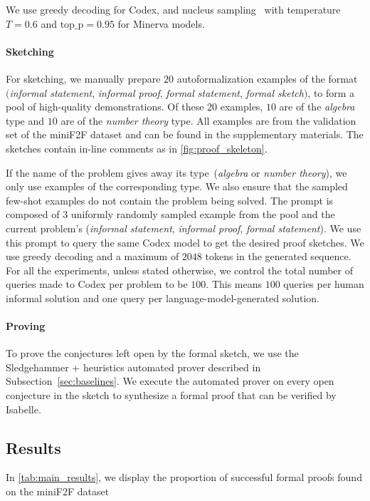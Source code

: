 We use greedy decoding for Codex, and nucleus sampling~\citep{holtzman2019curious} with temperature $T=0.6$ and $\textrm{top}\_\textrm{p}=0.95$ for Minerva models.

\paragraph{Sketching}
For sketching, we manually prepare $20$ autoformalization examples of the format $($\textit{informal statement}, \textit{informal proof}, \textit{formal statement}, \textit{formal sketch}$)$, to form a pool of high-quality demonstrations. Of these $20$ examples, $10$ are of the \textit{algebra} type and $10$ are of the \textit{number theory} type. All examples are from the validation set of the miniF2F dataset and can be found in the supplementary materials. The sketches contain in-line comments as in \autoref{fig:proof_skeleton}.

If the name of the problem gives away its type~(\textit{algebra} or \textit{number theory}), we only use examples of the corresponding type. We also ensure that the sampled few-shot examples do not contain the problem being solved. The prompt is composed of $3$ uniformly randomly sampled example from the pool and the current problem's (\textit{informal statement}, \textit{informal proof}, \textit{formal statement}). We use this prompt to query the same Codex model to get the desired proof sketches. We use greedy decoding and a maximum of $2048$ tokens in the generated sequence. For all the experiments, unless stated otherwise, we control the total number of queries made to Codex per problem to be $100$. This means $100$ queries per human informal solution and one query per language-model-generated solution.

\paragraph{Proving}
To prove the conjectures left open by the formal sketch, we use the Sledgehammer + heuristics automated prover described in Subsection~\ref{sec:baselines}. We execute the automated prover on every open conjecture in the sketch to synthesize a formal proof that can be verified by Isabelle.

\subsection{Results}

In \autoref{tab:main_results}, we display the proportion of successful formal proofs found on the miniF2F dataset

